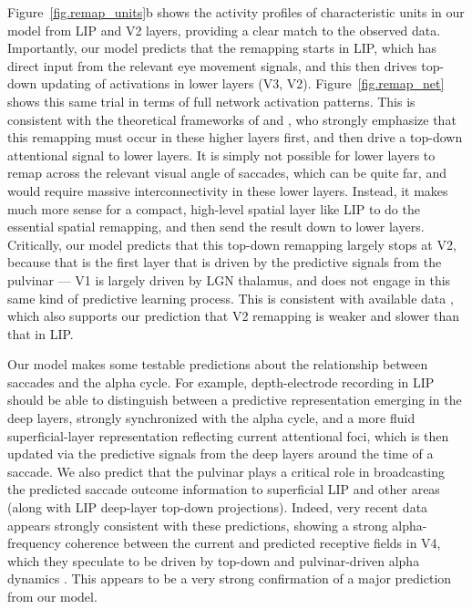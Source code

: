 \documentclass[11pt,twoside]{article}
\newif\myifpdf
\begin{document}
Figure~\ref{fig.remap_units}b shows the activity profiles of characteristic units in our model from LIP and V2 layers, providing a clear match to the observed data.  Importantly, our model predicts that the remapping starts in LIP, which has direct input from the relevant eye movement signals, and this then drives top-down updating of activations in lower layers (V3, V2).  Figure~\ref{fig.remap_net} shows this same trial in terms of full network activation patterns.  This is consistent with the theoretical frameworks of  and , who strongly emphasize that this remapping must occur in these higher layers first, and then drive a top-down attentional signal to lower layers.  It is simply not possible for lower layers to remap across the relevant visual angle of saccades, which can be quite far, and would require massive interconnectivity in these lower layers.  Instead, it makes much more sense for a compact, high-level spatial layer like LIP to do the essential spatial remapping, and then send the result down to lower layers.  Critically, our model predicts that this top-down remapping largely stops at V2, because that is the first layer that is driven by the predictive signals from the pulvinar --- V1 is largely driven by LGN thalamus, and does not engage in this same kind of predictive learning process.  This is consistent with available data \cite{NakamuraColby02}, which also supports our prediction that V2 remapping is weaker and slower than that in LIP.

Our model makes some testable predictions about the relationship between saccades and the alpha cycle.  For example, depth-electrode recording in LIP should be able to distinguish between a predictive representation emerging in the deep layers, strongly synchronized with the alpha cycle, and a more fluid superficial-layer representation reflecting current attentional foci, which is then updated via the predictive signals from the deep layers around the time of a saccade.  We also predict that the pulvinar plays a critical role in broadcasting the predicted saccade outcome information to superficial LIP and other areas (along with LIP deep-layer top-down projections).  Indeed, very recent data appears strongly consistent with these predictions, showing a strong alpha-frequency coherence between the current and predicted receptive fields in V4, which they speculate to be driven by top-down and pulvinar-driven alpha dynamics \cite{NeupaneGuittonPack2017}.  This appears to be a very strong confirmation of a major prediction from our model.
\end{document}
